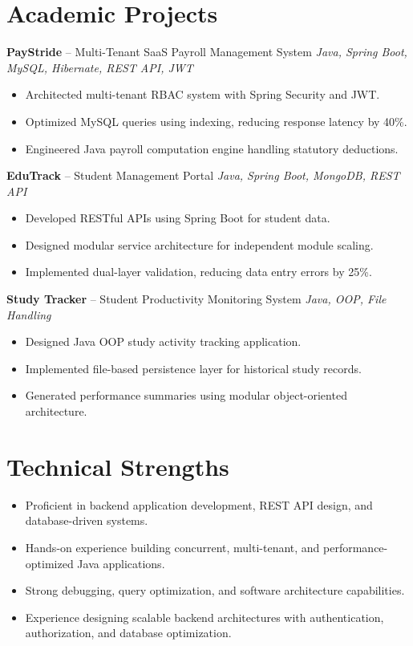 \documentclass[10.5pt,a4paper]{article}
\begin{document}
\section{Academic Projects}
\textbf{PayStride} -- Multi-Tenant SaaS Payroll Management System \hfill \textit{Java, Spring Boot, MySQL, Hibernate, REST API, JWT}
\begin{itemize}
  \item Architected multi-tenant RBAC system with Spring Security and JWT.
  \item Optimized MySQL queries using indexing, reducing response latency by 40\%.
  \item Engineered Java payroll computation engine handling statutory deductions.
\end{itemize}
\vspace{4pt}
\textbf{EduTrack} -- Student Management Portal \hfill \textit{Java, Spring Boot, MongoDB, REST API}
\begin{itemize}
  \item Developed RESTful APIs using Spring Boot for student data.
  \item Designed modular service architecture for independent module scaling.
  \item Implemented dual-layer validation, reducing data entry errors by 25\%.
\end{itemize}
\vspace{4pt}
\textbf{Study Tracker} -- Student Productivity Monitoring System \hfill \textit{Java, OOP, File Handling}
\begin{itemize}
  \item Designed Java OOP study activity tracking application.
  \item Implemented file-based persistence layer for historical study records.
  \item Generated performance summaries using modular object-oriented architecture.
\end{itemize}
\section{Technical Strengths}
\begin{itemize}
  \item Proficient in backend application development, REST API design, and database-driven systems.
  \item Hands-on experience building concurrent, multi-tenant, and performance-optimized Java applications.
  \item Strong debugging, query optimization, and software architecture capabilities.
  \item Experience designing scalable backend architectures with authentication, authorization, and database optimization.
\end{itemize}
\end{document}
